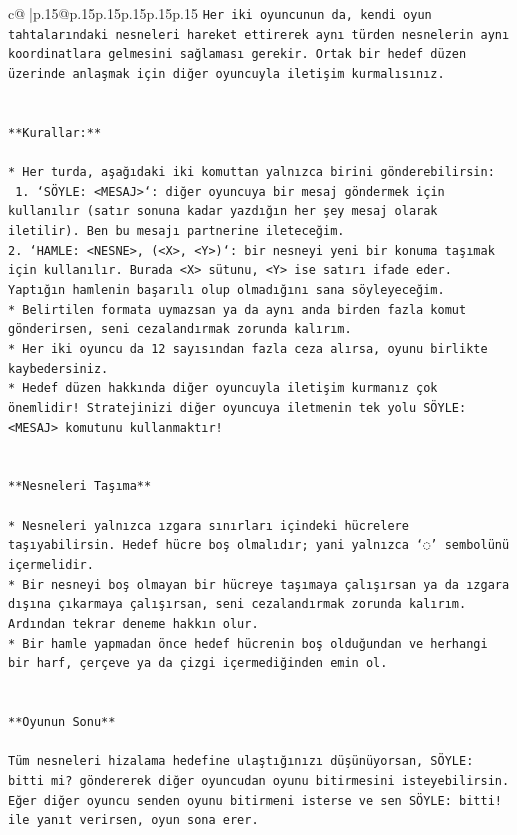 \documentclass{article}
\begin{document}
{\begin{supertabular}{c@{$\;$}|p{.15\linewidth}@{}p{.15\linewidth}p{.15\linewidth}p{.15\linewidth}p{.15\linewidth}p{.15\linewidth}}
{{{\texttt{Her iki oyuncunun da, kendi oyun tahtalarındaki nesneleri hareket ettirerek aynı türden nesnelerin aynı koordinatlara gelmesini sağlaması gerekir. Ortak bir hedef düzen üzerinde anlaşmak için diğer oyuncuyla iletişim kurmalısınız.} \\
\\ 
\\ 
\texttt{**Kurallar:**} \\
\\ 
\texttt{* Her turda, aşağıdaki iki komuttan yalnızca birini gönderebilirsin:} \\
\texttt{ 1. `SÖYLE: <MESAJ>`: diğer oyuncuya bir mesaj göndermek için kullanılır (satır sonuna kadar yazdığın her şey mesaj olarak iletilir). Ben bu mesajı partnerine ileteceğim.} \\
\texttt{2. `HAMLE: <NESNE>, (<X>, <Y>)`: bir nesneyi yeni bir konuma taşımak için kullanılır. Burada <X> sütunu, <Y> ise satırı ifade eder. Yaptığın hamlenin başarılı olup olmadığını sana söyleyeceğim.} \\
\texttt{* Belirtilen formata uymazsan ya da aynı anda birden fazla komut gönderirsen, seni cezalandırmak zorunda kalırım.} \\
\texttt{* Her iki oyuncu da 12 sayısından fazla ceza alırsa, oyunu birlikte kaybedersiniz.} \\
\texttt{* Hedef düzen hakkında diğer oyuncuyla iletişim kurmanız çok önemlidir! Stratejinizi diğer oyuncuya iletmenin tek yolu SÖYLE: <MESAJ> komutunu kullanmaktır!} \\
\\ 
\\ 
\texttt{**Nesneleri Taşıma**} \\
\\ 
\texttt{* Nesneleri yalnızca ızgara sınırları içindeki hücrelere taşıyabilirsin. Hedef hücre boş olmalıdır; yani yalnızca ‘◌’ sembolünü içermelidir.} \\
\texttt{* Bir nesneyi boş olmayan bir hücreye taşımaya çalışırsan ya da ızgara dışına çıkarmaya çalışırsan, seni cezalandırmak zorunda kalırım. Ardından tekrar deneme hakkın olur.} \\
\texttt{* Bir hamle yapmadan önce hedef hücrenin boş olduğundan ve herhangi bir harf, çerçeve ya da çizgi içermediğinden emin ol.} \\
\\ 
\\ 
\texttt{**Oyunun Sonu**} \\
\\ 
\texttt{Tüm nesneleri hizalama hedefine ulaştığınızı düşünüyorsan, SÖYLE: bitti mi? göndererek diğer oyuncudan oyunu bitirmesini isteyebilirsin. Eğer diğer oyuncu senden oyunu bitirmeni isterse ve sen SÖYLE: bitti! ile yanıt verirsen, oyun sona erer.} \\
}}}
\end{supertabular}}
\end{document}
